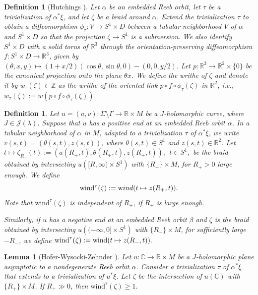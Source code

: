 \documentclass{amsart}
\newcommand{\C}{\mathbb{C}}
\newcommand{\R}{\mathbb{R}}
\newcommand{\Z}{\mathbb{Z}}
\newtheorem{lemma}[theorem]{Lemma}
\newtheorem{definition}[theorem]{Definition}
\newcommand{\wind}{\text{wind}^{\tau}}
\begin{document}
\begin{definition}[Hutchings {\cite[Definition 2.8]{H2009}}] 
Let $\alpha$ be an embedded Reeb orbit, let $\tau$ be a trivialization of $\alpha^*\xi$, and let $\zeta$ be a braid around $\alpha$. Extend the trivialization $\tau$ to obtain a diffeomorphism $\phi_{\tau}: V \to S^1 \times D$ between a tubular neighborhood $V$ of $\alpha$ and $S^1 \times D$ so that the projection $\zeta \to S^1$ is a submersion. We also identify $S^1 \times D$ with a solid torus of $\R^3$ through the orientation-preserving diffeomorphism $f: S^1 \times D \to \R^3$, given by
$\left(\theta, x,y\right) \mapsto \left(1+x/2\right)(\cos \theta, \sin \theta,0)-\left(0,0,y/2\right).$
Let $p:\R^3 \to \R^2\times \{0\}$ be the canonical projection onto the plane $\theta x$. We define the writhe of $\zeta$ and denote it by $w_{\tau}(\zeta) \in \Z$ as the writhe of the oriented link $p \circ f \circ \phi_{\tau}(\zeta) $ in $\R^2$, i.e.,
$w_{\tau}(\zeta):=w(p \circ f \circ \phi_{\tau}(\zeta)).$
\end{definition}

\begin{definition}
Let $u=(a,v):\Sigma \setminus \Gamma \to \R \times M$ be a $J$-holomorphic curve, where $J \in \mathcal{J}(\lambda)$. Suppose that $u$ has a positive end at an embedded Reeb orbit $\alpha$. In a tubular neighborhood of $\alpha$ in $M$, adapted to a trivialization $\tau$ of $\alpha^*\xi$, we write  $v(s,t)=(\theta(s,t),z(s,t))$, where $\theta(s,t) \in S^1$ and $z(s,t) \in \R^2$. Let $t\mapsto \zeta_{R_+}(t):=(a(R_{+},t),\theta(R_{+},t),z(R_{+},t)), \ \ t\in S^1,$ be the braid obtained by intersecting $u\left([R,\infty) \times S^1\right)$ with $\{R_{+}\}\times M $, for $R_{+}>0$ large enough. We define
\begin{equation}
\wind(\zeta):={\text wind}(t \mapsto z(R_{+},t)).
\label{eq:defwind}
\end{equation}
Note that $\wind(\zeta)$ is independent of $R_{+}$, if $R_{+}$ is large enough.

Similarly, if $u$ has a negative end at an embedded Reeb orbit  $\beta$ and $\zeta$ is the braid obtained by intersecting $u\left((-\infty,0] \times S^1\right)$ with $\{ R_{-}\}\times M$, for sufficiently large $-R_{-}$, we define
$\wind(\zeta):={\rm wind}(t \mapsto z(R_{-},t)).$
\end{definition}

\begin{lemma}[Hofer-Wysocki-Zehnder \cite{prop2}] \label{wind pi} 
Let $u:\C \to \R \times M$ be a $J$-holomorphic plane asymptotic to a nondegenerate Reeb orbit $\alpha$. Consider a trivialization $\tau$ of $\alpha^*\xi$ that extends to a trivialization of $u^*\xi$. Let $\zeta$ be the intersection of $u(\C)$ with $\{R_{+}\}\times M$. If $R_{+} \gg 0$, then
$\wind(\zeta) \geq 1.$
\end{lemma}
\end{document}
